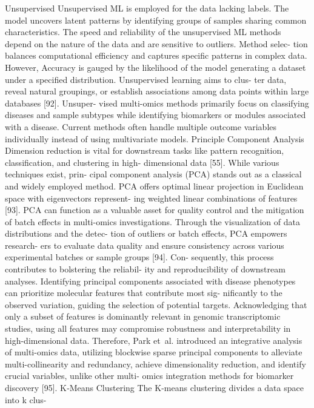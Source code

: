 Unsupervised
Unsupervised ML is employed for the data lacking labels.
The model uncovers latent patterns by identifying groups
of samples sharing common characteristics. The speed and
reliability of the unsupervised ML methods depend on the
nature of the data and are sensitive to outliers. Method selec-
tion balances computational efficiency and captures specific
patterns in complex data. However, Accuracy is gauged by
the likelihood of the model generating a dataset under a
specified distribution. Unsupervised learning aims to clus-
ter data, reveal natural groupings, or establish associations
among data points within large databases [92]. Unsuper-
vised multi-omics methods primarily focus on classifying
diseases and sample subtypes while identifying biomarkers
or modules associated with a disease. Current methods often
handle multiple outcome variables individually instead of
using multivariate models.
Principle Component Analysis
Dimension reduction is vital for downstream tasks like
pattern recognition, classification, and clustering in high-
dimensional data [55]. While various techniques exist, prin-
cipal component analysis (PCA) stands out as a classical
and widely employed method. PCA offers optimal linear
projection in Euclidean space with eigenvectors represent-
ing weighted linear combinations of features [93]. PCA
can function as a valuable asset for quality control and the
mitigation of batch effects in multi-omics investigations.
Through the visualization of data distributions and the detec-
tion of outliers or batch effects, PCA empowers research-
ers to evaluate data quality and ensure consistency across
various experimental batches or sample groups [94]. Con-
sequently, this process contributes to bolstering the reliabil-
ity and reproducibility of downstream analyses. Identifying
principal components associated with disease phenotypes
can prioritize molecular features that contribute most sig-
nificantly to the observed variation, guiding the selection
of potential targets. Acknowledging that only a subset of
features is dominantly relevant in genomic transcriptomic
studies, using all features may compromise robustness and
interpretability in high-dimensional data. Therefore, Park
et al. introduced an integrative analysis of multi-omics data,
utilizing blockwise sparse principal components to alleviate
multi-collinearity and redundancy, achieve dimensionality
reduction, and identify crucial variables, unlike other multi-
omics integration methods for biomarker discovery [95].
K‑Means Clustering
The K-means clustering divides a data space into k clus-
